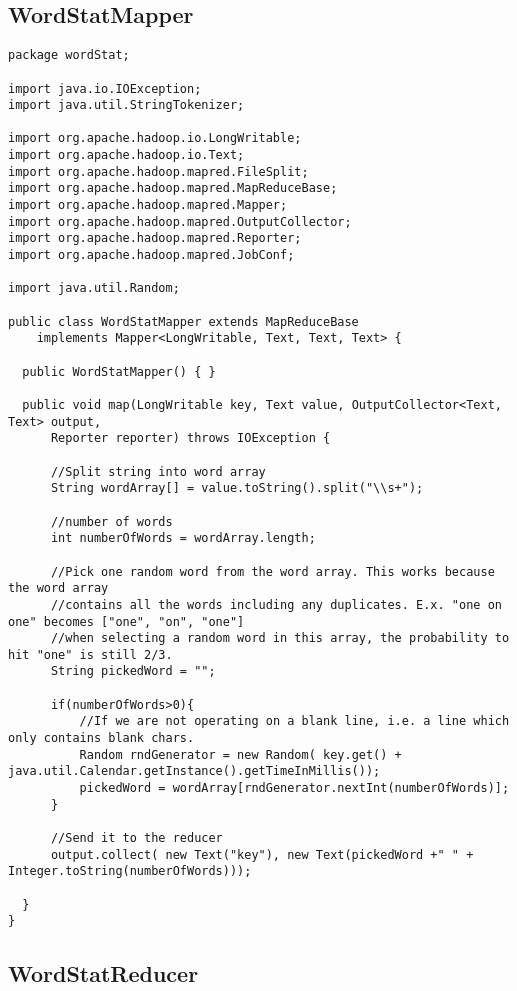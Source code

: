 \documentclass[10pt, a4paper]{article}
\begin{document}
\subsection{WordStatMapper} %
\label{sub:wordstatmapper}
\begin{lstlisting}
package wordStat;

import java.io.IOException;
import java.util.StringTokenizer;

import org.apache.hadoop.io.LongWritable;
import org.apache.hadoop.io.Text;
import org.apache.hadoop.mapred.FileSplit;
import org.apache.hadoop.mapred.MapReduceBase;
import org.apache.hadoop.mapred.Mapper;
import org.apache.hadoop.mapred.OutputCollector;
import org.apache.hadoop.mapred.Reporter;
import org.apache.hadoop.mapred.JobConf;

import java.util.Random;

public class WordStatMapper extends MapReduceBase
    implements Mapper<LongWritable, Text, Text, Text> {

  public WordStatMapper() { }

  public void map(LongWritable key, Text value, OutputCollector<Text, Text> output,
      Reporter reporter) throws IOException {
	 
	  //Split string into word array
	  String wordArray[] = value.toString().split("\\s+");
	  
	  //number of words
	  int numberOfWords = wordArray.length;
	  
	  //Pick one random word from the word array. This works because the word array
	  //contains all the words including any duplicates. E.x. "one on one" becomes ["one", "on", "one"]
	  //when selecting a random word in this array, the probability to hit "one" is still 2/3.
	  String pickedWord = "";
	  
	  if(numberOfWords>0){
		  //If we are not operating on a blank line, i.e. a line which only contains blank chars.
		  Random rndGenerator = new Random( key.get() + java.util.Calendar.getInstance().getTimeInMillis());
		  pickedWord = wordArray[rndGenerator.nextInt(numberOfWords)];
	  }
	 
	  //Send it to the reducer
	  output.collect( new Text("key"), new Text(pickedWord +" " + Integer.toString(numberOfWords)));
	 
  }
}  
\end{lstlisting}


\subsection{WordStatReducer} %
\label{sub:wordstatreducer}
\end{document}
